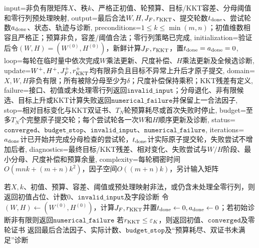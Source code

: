 \begin{AlgorithmContract}{
  input={非负有限矩阵$X$、秩$k$、严格正初值、轮预算、目标/KKT容差、分母阈值和零行列预处理映射},
  output={最后合法$W,H,J_F,r_{\rm KKT}$、提交轮数$t_{\rm done}$、尝试轮数$a_{\rm done}$、状态、轨迹与诊断},
  preconditions={$1\le k\le\min(m,n)$；初值维数相容且严格正；预算非负，容差/阈值合法；零行列策略已完成},
  initialization={验证后令$(W,H)=(W^{(0)},H^{(0)})$，新鲜计算$J_F,r_{\rm KKT}$，置$t_{\rm done}=a_{\rm done}=0$},
  loop={每轮在临时量中依次完成$W$乘法更新、尺度补偿、$H$乘法更新及全候选诊断},
  update={$W^+,H^+,J_F^+,r_{\rm KKT}^+$均有限非负且目标不异常上升后才原子提交},
  domain={$X,W,H$非负有限；所有被除分母至少为$\delta$；尺度补偿保持乘积；KKT残差有定义},
  failure={接口、初值或未处理零行列返回$\mathtt{invalid\_input}$；分母退化、非有限候选、目标上升或KKT计算失败返回$\mathtt{numerical\_failure}$并保留上一合法因子},
  stop={相对目标变化与KKT双证书、$T_N$轮预算耗尽或首次失败时停止},
  budget={至多$T_N$个完整原子提交轮；每个尝试轮各一次$W$和$H$顺序更新及诊断},
  status={$\mathtt{converged}$、$\mathtt{budget\_stop}$、$\mathtt{invalid\_input}$、$\mathtt{numerical\_failure}$},
  iterations={$a_{\rm done}$计已开始并完成分母检查的尝试轮，$t_{\rm done}$计实际原子提交轮，失败尝试不增加后者},
  diagnostics={最终目标/KKT残差、相对变化、失败尝试与$W/H$阶段、最小分母、尺度补偿和预算余量},
  complexity={每轮稠密时间$O(mnk+(m+n)k^2)$，因子空间$O((m+n)k)$，另计输入矩阵}
}
\begin{algorithm}[tbp]
\caption{平方损失NMF的顺序乘法更新}\label{alg:V4-C05-nmf-fro}
若$X,k$、初值、预算、容差、阈值或预处理映射非法，或仍含未处理全零行列，则返回初值占位、计数$0$、$\mathtt{invalid\_input}$及字段诊断\;
令$(W,H)\leftarrow(W^{(0)},H^{(0)})$，计算$J_F,r_{\rm KKT}$并置$t_{\rm done}\leftarrow0,a_{\rm done}\leftarrow0$；若初始诊断非有限则返回$\mathtt{numerical\_failure}$\;
若$r_{\rm KKT}\le\varepsilon_K$，则返回初值、$\mathtt{converged}$及零轮证书\;
返回最后合法因子、实际计数、$\mathtt{budget\_stop}$及“预算耗尽、双证书未满足”诊断\;
\end{algorithm}
\end{AlgorithmContract}
